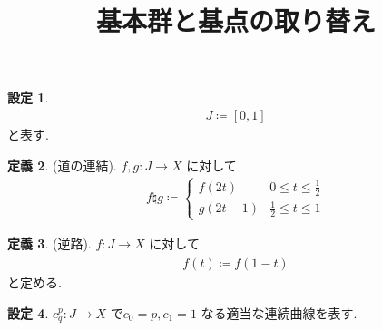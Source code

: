 \documentclass[10pt, fleqn, label-section=none]{bxjsarticle}
\title{基本群と基点の取り替え}
\date{}
\author{}
\theoremstyle{definition}
\newtheorem{dfn}{定義}[section]
\newtheorem{setting}[dfn]{設定}
\renewcommand{\;}{\, ; \,}
\begin{document}
\maketitle

\section{}


\begin{setting}
\begin{align*} J \coloneqq [0,1]\end{align*}
と表す. 
\end{setting}

\begin{dfn}(道の連結). $f, g:J \rightarrow X$ に対して
\begin{align*} f \natural g \coloneqq \begin{cases} f(2t) & 0 \leq t \leq \frac{1}{2} \\ g(2t -1) & \frac{1}{2} \leq t \leq 1 \end{cases} \end{align*}
\end{dfn}

\begin{dfn}(逆路). $f :J \rightarrow X$ に対して
\begin{align*} \bar f(t) \coloneqq f(1- t) \end{align*}
と定める. 
\end{dfn}

\begin{setting}$c_q^p : J \rightarrow X$ で$c_0 = p, c_1 = 1$ なる適当な連続曲線を表す. 

\end{setting}
\end{document}
